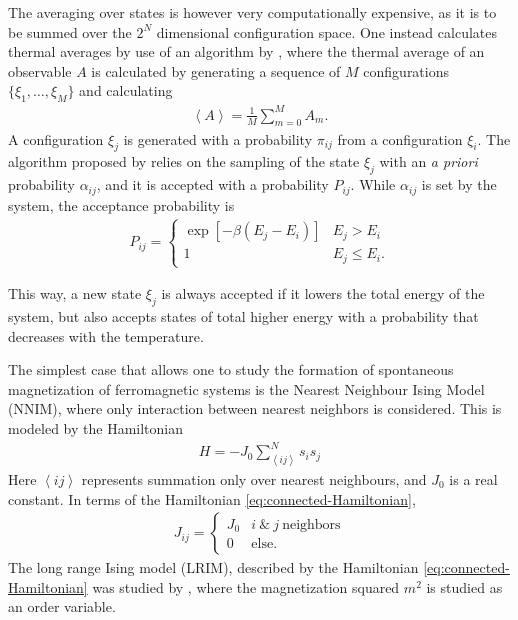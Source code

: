 The averaging over states is however very computationally expensive, as it is to be summed over the $2^N$ dimensional configuration space. One instead calculates thermal averages by use of an algorithm by \cite{Metropolis1953}, where the thermal average of an observable $A$ is calculated by generating a sequence of $M$ configurations $\{ \xi_1, \ldots, \xi_M \}$ and calculating  
\begin{align}
	\left<A \right> = \frac{1}{M} \sum_{m=0}^M A_m.
\end{align}
A configuration $\xi_j$  is generated with a probability $\pi_{ij}$ from a configuration $\xi_i$. The algorithm proposed by \cite{Metropolis1953} relies on the sampling of the state $\xi_j$ with an \textit{a priori} probability  $\alpha_{ij}$, and it is accepted with a probability $P_{ij}$. While $\alpha_{ij}$ is set by the system, the acceptance probability is  \begin{align}
	P_{ij} = 
	\begin{cases}
		\exp[-\beta (E_{j}	- E_{i})] & E_j > E_i \\
		1 & E_j \leq E_i. 
	\end{cases}
	\label{eq:acceptance-probability}
\end{align}

This way, a new state $\xi_j$ is always accepted if it lowers the total energy of the system, but also accepts states of total higher energy with a probability that decreases with the temperature.

The simplest case that allows one to study the formation of spontaneous magnetization of ferromagnetic systems is the Nearest Neighbour Ising Model (NNIM), where only interaction between nearest neighbors is considered. This is modeled by the Hamiltonian
\begin{align}
	H  = - J_0 \sum_{\left<ij \right>}^N s_i s_j
\end{align} 
Here $\left< ij \right>$ represents summation only over nearest neighbours, and $J_0$ is a real constant. In terms of the Hamiltonian \eqref{eq:connected-Hamiltonian}, 
\begin{align}
	J_{ij} = 
	\begin{cases}
	J_0 & i ~\& ~j ~\text{neighbors} \\	
	0 & \text{else}.
	\end{cases}
\end{align}
The long range Ising model (LRIM), described by the Hamiltonian \eqref{eq:connected-Hamiltonian} was studied by \cite{Janke2023}, where the magnetization squared $m^2$ is studied as an order variable. 

